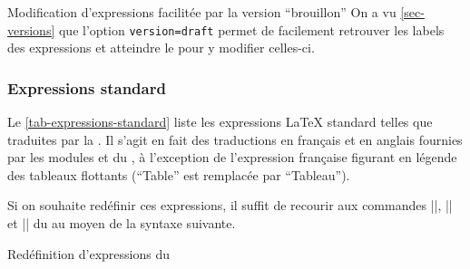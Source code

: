 \begin{dbremark}{Modification d'expressions facilitée par la version
    \enquote{brouillon}}{}
  On a vu \vref{sec-versions} que l'option
  \lstinline[deletekeywords={version}]|version=draft| permet de facilement
  retrouver les labels des expressions et atteindre le \File{\configurationfile}
  pour y modifier celles-ci.
\end{dbremark}

\subsubsection{Expressions standard}
\label{sec-expressions-standard}%
%

Le \vref{tab-expressions-standard} liste les expressions \LaTeX{} standard
telles que traduites par la \yatCl{}. Il s'agit en fait des traductions en
français et en anglais fournies par les modules  et
 du , à l'exception de l'expression française
figurant en légende des tableaux flottants (\enquote{Table} est remplacée par
\enquote{Tableau}).%
%

Si on souhaite redéfinir ces expressions, il suffit de recourir aux commandes
|\addto|, |\captionsfrench| et |\captionsenglish| du  au moyen
de la syntaxe suivante.

\begin{preamblecode}[title=Par exemple dans le \File{\configurationfile}]
\addto{}
\addto{}
\end{preamblecode}
\begin{table}[hb]
  \centering
  \caption{Valeurs et commandes d'expressions \LaTeX{} standard fournies par la \yatCl{}}
  \label{tab-expressions-standard}
  
\end{table}
%
\begin{dbexample}{Redéfinition d'expressions du }{}
\begin{preamblecode}[title=Redéfinition des expressions pour les résumés]
\addto{}
\addto{}
\end{preamblecode}
\end{dbexample}

